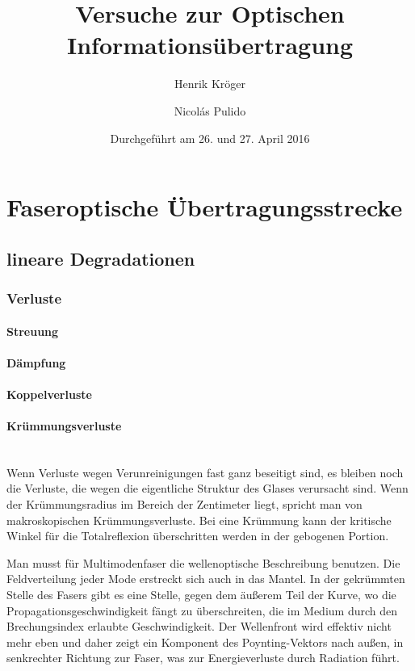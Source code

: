 \documentclass[a4paper]{article}
\title{Versuche zur Optischen Informationsübertragung}
\author{Henrik Kröger \and Nicolás Pulido}
\date{Durchgeführt am 26. und 27. April 2016}
\begin{document}


\maketitle


\tableofcontents

\newpage
\section{Faseroptische Übertragungsstrecke}

\subsection{lineare Degradationen}

\subsubsection{Verluste}
\paragraph{Streuung}
\paragraph{Dämpfung}
\paragraph{Koppelverluste}
\paragraph{Krümmungsverluste}
\ \\

\noindent Wenn Verluste wegen Verunreinigungen fast ganz beseitigt sind, es
bleiben noch die Verluste, die wegen die eigentliche Struktur des Glases
verursacht sind.  Wenn der Krümmungsradius im Bereich der Zentimeter liegt,
spricht man von makroskopischen Krümmungsverluste. 
Bei eine Krümmung kann der kritische Winkel für die Totalreflexion
überschritten werden in der gebogenen Portion. 

Man musst für Multimodenfaser die wellenoptische Beschreibung benutzen. Die
Feldverteilung jeder Mode erstreckt sich auch in das Mantel. In der gekrümmten
Stelle des Fasers gibt es eine Stelle, gegen dem äußerem Teil der Kurve, wo die
Propagationsgeschwindigkeit fängt zu überschreiten, die im Medium durch den
Brechungsindex erlaubte Geschwindigkeit. Der Wellenfront wird effektiv nicht
mehr eben und daher zeigt ein Komponent des Poynting-Vektors nach außen, in
senkrechter Richtung zur Faser, was zur Energieverluste durch Radiation führt. 
\end{document}
